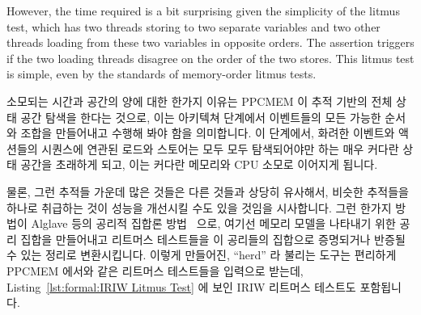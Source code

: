 However, the time required is a bit surprising given the simplicity
of the litmus test, which has two threads storing to two separate variables
and two other threads loading from these two variables in opposite
orders.
The assertion triggers if the two loading threads disagree on the order
of the two stores.
This litmus test is simple, even by the standards of memory-order litmus
tests.
\fi

소모되는 시간과 공간의 양에 대한 한가지 이유는 PPCMEM 이 추적 기반의 전체 상태
공간 탐색을 한다는 것으로, 이는 아키텍쳐 단계에서 이벤트들의 모든 가능한 순서와
조합을 만들어내고 수행해 봐야 함을 의미합니다.
이 단계에서, 화려한 이벤트와 액션들의 시퀀스에 연관된 로드와 스토어는 모두 모두
탐색되어야만 하는 매우 커다란 상태 공간을 초래하게 되고, 이는 커다란 메모리와
CPU 소모로 이어지게 됩니다.

물론, 그런 추적들 가운데 많은 것들은 다른 것들과 상당히 유사해서, 비슷한
추적들을 하나로 취급하는 것이 성능을 개선시킬 수도 있을 것임을 시사합니다.
그런 한가지 방법이 Alglave 등의 공리적 집합론
방법~\cite{Alglave:2014:HCM:2594291.2594347} 으로, 여기선 메모리 모델을
나타내기 위한 공리 집합을 만들어내고 리트머스 테스트들을 이 공리들의 집합으로
증명되거나 반증될 수 있는 정리로 변환시킵니다.
이렇게 만들어진, ``herd'' 라 불리는 도구는 편리하게 PPCMEM 에서와 같은 리트머스
테스트들을 입력으로 받는데,
Listing~\ref{lst:formal:IRIW Litmus Test} 에 보인 IRIW 리트머스 테스트도
포함됩니다.
\iffalse

One reason for the amount of time and space consumed is that PPCMEM does
a trace-based full-state-space search, which means that it must generate
and evaluate all possible orders and combinations of events at the
architectural level.
At this level, both loads and stores correspond to ornate sequences
of events and actions, resulting in a very large state space that must
be completely searched, in turn resulting in large memory and CPU
consumption.

Of course, many of the traces are quite similar to one another, which
suggests that an approach that treated similar traces as one might
improve performace.
One such approach is the axiomatic approach of
Alglave et al.~\cite{Alglave:2014:HCM:2594291.2594347},
which creates a set of axioms to represent the memory model and then
converts litmus tests to theorems that might be proven or disproven
over this set of axioms.
The resulting tool, called ``herd'',  conveniently takes as input the
same litmus tests as PPCMEM, including the IRIW litmus test shown in
Listing~\ref{lst:formal:IRIW Litmus Test}.
\fi

